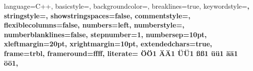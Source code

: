 {
  language=C++,	%
  basicstyle=\scriptsize\ttfamily,	%
  backgroundcolor=\color{white},		%
  breaklines=true,	%
  keywordstyle=\bfseries\ttfamily\color{blue},	%
  stringstyle=\ttfamily\color{Peach},			%
  showstringspaces=false,	%
  commentstyle=\color{ForestGreen}\ttfamily,	%
  flexiblecolumns=false,	%
  numbers=left,		%
  numberstyle=\tiny,	%
  numberblanklines=false,		%
  stepnumber=1,		%
  numbersep=10pt,		%
  xleftmargin=20pt,	%
  xrightmargin=10pt,	%
  extendedchars=true,	%
  frame=trbl,			%
  frameround=ffff,	%
  literate=		%
   {Ö}{{\"O}}1 
   {Ä}{{\"A}}1 
   {Ü}{{\"U}}1 
   {ß}{{\ss}}1 
   {ü}{{\"u}}1 
   {ä}{{\"a}}1 
   {ö}{{\"o}}1,
}